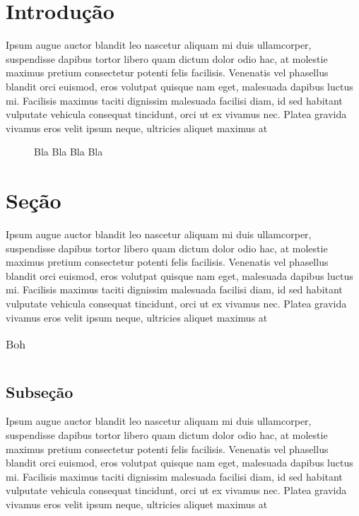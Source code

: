 \documentclass[msc, classic, a4paper, oneside]{ufbathesis}
\begin{document}

\section{Introdução}
Ipsum augue auctor blandit leo nascetur aliquam mi duis ullamcorper, suspendisse dapibus tortor libero quam dictum dolor odio hac, at molestie maximus pretium consectetur potenti felis facilisis. Venenatis vel phasellus blandit orci euismod, eros volutpat quisque nam eget, malesuada dapibus luctus mi. Facilisis maximus taciti dignissim malesuada facilisi diam, id sed habitant vulputate vehicula consequat tincidunt, orci ut ex vivamus nec. Platea gravida vivamus eros velit ipsum neque, ultricies aliquet maximus at

\begin{figure}
\caption{Bla Bla Bla Bla}
\label{fig:bla}
\end{figure}

\section{Seção}
Ipsum augue auctor blandit leo nascetur aliquam mi duis ullamcorper, suspendisse dapibus tortor libero quam dictum dolor odio hac, at molestie maximus pretium consectetur potenti felis facilisis. Venenatis vel phasellus blandit orci euismod, eros volutpat quisque nam eget, malesuada dapibus luctus mi. Facilisis maximus taciti dignissim malesuada facilisi diam, id sed habitant vulputate vehicula consequat tincidunt, orci ut ex vivamus nec. Platea gravida vivamus eros velit ipsum neque, ultricies aliquet maximus at

\begin{table}[hb]
\caption{Boh}
\begin{tabular}{|l|l|r|}
\end{tabular}
\label{tab:boh}
\end{table}

\subsection{Subseção}
Ipsum augue auctor blandit leo nascetur aliquam mi duis ullamcorper, suspendisse dapibus tortor libero quam dictum dolor odio hac, at molestie maximus pretium consectetur potenti felis facilisis. Venenatis vel phasellus blandit orci euismod, eros volutpat quisque nam eget, malesuada dapibus luctus mi. Facilisis maximus taciti dignissim malesuada facilisi diam, id sed habitant vulputate vehicula consequat tincidunt, orci ut ex vivamus nec. Platea gravida vivamus eros velit ipsum neque, ultricies aliquet maximus at
\end{document}

